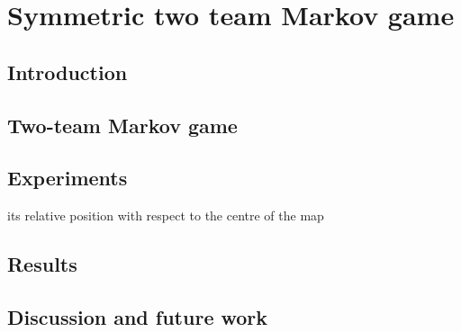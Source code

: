 \chapter{Symmetric two team Markov game}\label{ch:2teams}
\section{Introduction}
\section{Two-team Markov game}
\section{Experiments}
its relative position with respect to the centre of the map 
\section{Results}
\section{Discussion and future work}
